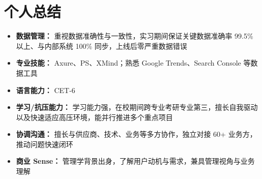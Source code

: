 \documentclass{resume}
\begin{document}
\section[个人总结]{个人总结}

\begin{itemize}
  \item \textbf{数据管理：} 重视数据准确性与一致性，实习期间保证关键数据准确率 99.5\% 以上、与内部系统 100\% 同步，上线后零严重数据错误
  \item \textbf{专业技能：} Axure、PS、XMind；熟悉 Google Trends、Search Console 等数据工具
  \item \textbf{语言能力：} CET-6
  \item \textbf{学习/抗压能力：} 学习能力强，在校期间跨专业考研专业第三，擅长自我驱动以及快速适应高压环境，能并行推进多个重点项目
  \item \textbf{协调沟通：} 擅长与供应商、技术、业务等多方协作，独立对接 60+ 业务方，推动问题快速闭环
  \item \textbf{商业 Sense：} 管理学背景出身，了解用户动机与需求，兼具管理视角与业务理解
\end{itemize}
\end{document}
